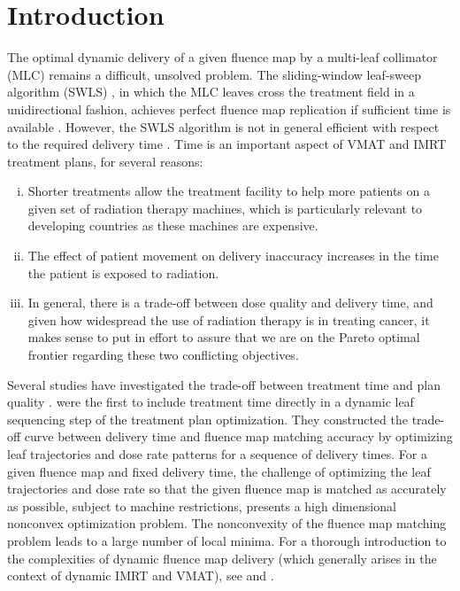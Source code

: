 \documentclass{iopart}
\begin{document}
\section{Introduction}
The optimal dynamic delivery of a given fluence map by a multi-leaf collimator (MLC) remains a difficult, unsolved problem.
The sliding-window leaf-sweep algorithm (SWLS) \cite{leafsweep},
    in which the MLC leaves cross the treatment field in a unidirectional fashion,
    achieves perfect fluence map replication if sufficient time is available \cite{Stein94}.
However, the SWLS algorithm is not in general efficient with respect to the required delivery time \cite{balvertcraft}.
Time is an important aspect of VMAT and IMRT treatment plans, for several reasons:
\begin{enumerate}[i)]
  \item Shorter treatments allow the treatment facility to help more patients on a given set of radiation therapy machines,
        which is particularly relevant to developing countries as these machines are expensive.
  \item The effect of patient movement on delivery inaccuracy increases in the time the patient is exposed to radiation.
  \item In general, there is a trade-off between dose quality and delivery time, and given how widespread the use of radiation therapy is in treating cancer, it makes sense to put in effort to assure that we are on the Pareto optimal frontier regarding these two conflicting objectives.

\end{enumerate}
Several studies have investigated the trade-off between treatment time and plan quality \cite{tradeoffSalari,tradeoffMCO,tradeoffCraft,balvertcraft}.
\cite{balvertcraft} were the first to include treatment time directly in a dynamic leaf sequencing step of the treatment plan optimization.
They constructed the trade-off curve between delivery time and fluence map matching accuracy by optimizing leaf trajectories and dose rate patterns for a sequence of delivery times.
For a given fluence map and fixed delivery time, the challenge of optimizing the leaf trajectories and dose rate so that the given fluence map is matched as accurately as possible, subject to machine restrictions, presents a high dimensional nonconvex optimization problem.
The nonconvexity of the fluence map matching problem leads to a large number of local minima.
For a thorough introduction to the complexities of dynamic fluence map delivery (which generally arises in the context of dynamic IMRT and VMAT), see \cite{balvertcraft} and \cite{unkvmatreview}.
\end{document}
